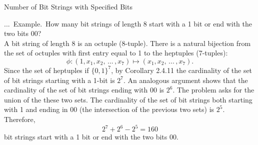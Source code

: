 \documentclass[smaller,hyperref={CJKbookmarks=true}]{beamer}
\newcounter{zhuo}[subsection]
\renewcommand{\thezhuo}{\thesection.\thesubsection.\arabic{zhuo}}
\newenvironment{EXAMPLE}{\stepcounter{zhuo}\alert{\!\thezhuo.~Example.\,}}{}
\begin{document}
\begin{frame}[t]{Number of Bit Strings with Specified Bits}
\begin{spacing}{1.05}
\begin{EXAMPLE}
How many bit strings of length 8 start with a 1 bit or
end with the two bits 00?\\[5pt]
A bit string of length 8 is an octuple (8-tuple). There is a natural bijection
from the set of octuples with first entry equal to 1 to the heptuples
(7-tuples):
\[\phi\!:(1,x_1,x_2,\,...\,,x_7)\mapsto(x_1,x_2,\,...\,,x_7).\]
Since the set of heptuples if $\{0,1\}^7$, by Corollary 2.4.11 the cardinality of the set of bit strings starting with a 1-bit is $2^7$. An analogous argument
shows that the cardinality of the set of bit strings ending with 00 is $2^6$. The problem asks for the union of the these two sets. The cardinality of
the set of bit strings both starting with 1 and ending in 00 (the
intersection of the previous two sets) is $2^5$. Therefore,
\[2^7+2^6-2^5=160\]
bit strings start with a 1 bit or end with the two bits 00.
\end{EXAMPLE}
\end{spacing}
\end{frame}
\end{document}
